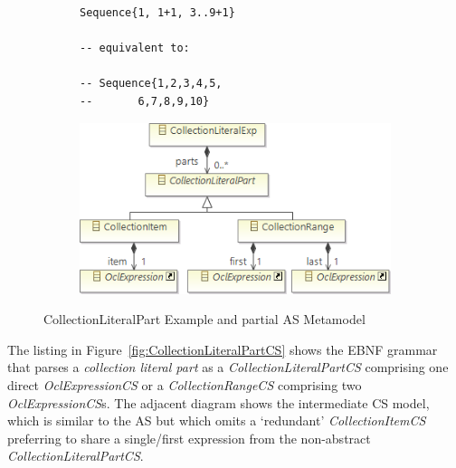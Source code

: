 \documentclass{llncs}
\begin{document}
\begin{figure}[htbp]
\centering
\begin{subfigure}{0.354\textwidth}
  \centering
\begin{lstlisting}[label=lst:CollectionLiteralExpExample, language=OCL]
Sequence{1, 1+1, 3..9+1}

-- equivalent to:

-- Sequence{1,2,3,4,5,
--       6,7,8,9,10}
\end{lstlisting} 
\end{subfigure}%
\begin{subfigure}{0.65\textwidth}
  \centering
  \includegraphics[scale=0.5]{images/CollectionLiteralPartAS.png}
\end{subfigure}
\caption{CollectionLiteralPart Example and partial AS Metamodel}
\label{fig:CollectionLiteralPartAS}
\end{figure}

The listing in Figure~\ref{fig:CollectionLiteralPartCS} shows the EBNF grammar that parses a \textit{collection literal part} as a \emph{CollectionLiteralPartCS} comprising one direct \emph{OclExpressionCS} or a \emph{CollectionRangeCS} comprising two \emph{OclExpressionCS}s. The adjacent diagram shows the intermediate CS model, which is similar to the AS but which omits a `redundant' \emph{CollectionItemCS} preferring to share a single/first expression from the non-abstract \emph{CollectionLiteralPartCS}.
\end{document}
